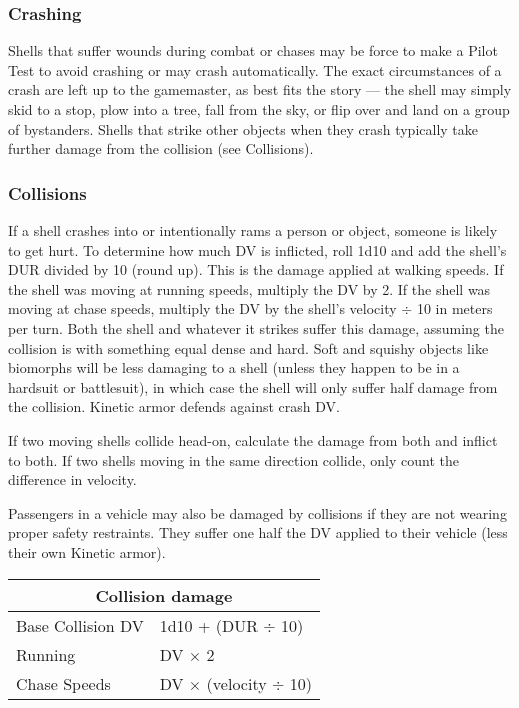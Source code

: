 \subsubsection{Crashing}

Shells that suffer wounds during combat or chases may be force to make a Pilot Test to avoid crashing or may crash automatically. The exact circumstances of a crash are left up to the gamemaster, as best fits the story --- the shell may simply skid to a stop, plow into a tree, fall from the sky, or flip over and land on a group of bystanders. Shells that strike other objects when they crash typically take further damage from the collision (see Collisions).

\subsubsection{Collisions}

If a shell crashes into or intentionally rams a person or object, someone is likely to get hurt. To determine how much DV is inflicted, roll 1d10 and add the shell’s DUR divided by 10 (round up). This is the damage applied at walking speeds. If the shell was moving at running speeds, multiply the DV by 2. If the shell was moving at chase speeds, multiply the DV by the shell’s velocity $\div$ 10 in meters per turn. Both the shell and whatever it strikes suffer this damage, assuming the collision is with something equal dense and hard. Soft and squishy objects like biomorphs will be less damaging to a shell (unless they happen to be in a hardsuit or battlesuit), in which case the shell will only suffer half damage from the collision. Kinetic armor defends against crash DV.

If two moving shells collide head-on, calculate the damage from both and inflict to both. If two shells moving in the same direction collide, only count the difference in velocity.

Passengers in a vehicle may also be damaged by collisions if they are not wearing proper safety restraints. They suffer one half the DV applied to their vehicle (less their own Kinetic armor).

\begin{table}
\begin{tabular}{|l|l|}
\hline
\multicolumn{2}{|c|}{\textbf{Collision damage}}	\\
\hline
Base Collision DV	& 1d10 + (DUR $\div$ 10)		\\
\hline
Running			& DV $\times$ 2					\\
\hline
Chase Speeds		& DV $\times$ (velocity $\div$ 10)	\\
\hline
\end{tabular}
\label{tab:collision-damage}
\end{table}

